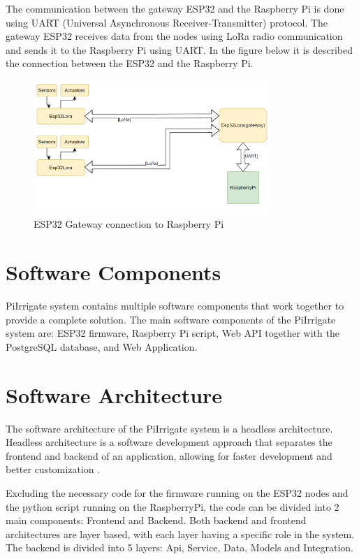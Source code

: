 The communication between the gateway ESP32 and the Raspberry Pi is done using UART (Universal Asynchronous Receiver-Transmitter) protocol.
The gateway ESP32 receives data from the nodes using LoRa radio communication and sends it to the Raspberry Pi using UART.
In the figure below it is described the connection between the ESP32 and the Raspberry Pi.

\begin{figure}[H]
    \centering
    \includegraphics[width=0.8\textwidth]{images/hardware-architecture.png}
    \caption{ESP32 Gateway connection to Raspberry Pi}
    \label{fig:esp32-gateway}
\end{figure}

\section{Software Components}
PiIrrigate system contains multiple software components that work together to provide a complete solution.
The main software components of the PiIrrigate system are: ESP32 firmware, Raspberry Pi script, 
Web API together with the PostgreSQL database, and Web Application.

\section {Software Architecture}
The software architecture of the PiIrrigate system is a headless architecture. Headless architecture is a software development
approach that separates the frontend and backend of an application, allowing for faster development and better 
customization \cite{headlessArchitecture}.

Excluding the necessary code for the firmware running on the ESP32 nodes and the python script
running on the RaspberryPi, the code can be divided into 2 main components: Frontend and Backend. 
Both backend and frontend architectures are layer based, with each layer having a specific role in the system.
The backend is divided into 5 layers: Api, Service, Data, Models and Integration.

